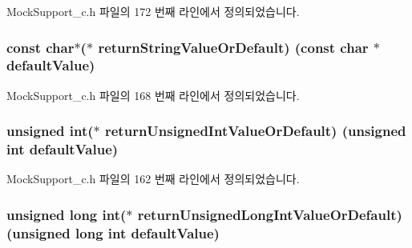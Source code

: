 Mock\+Support\+\_\+c.\+h 파일의 172 번째 라인에서 정의되었습니다.

\subsubsection[{\texorpdfstring{return\+String\+Value\+Or\+Default}{returnStringValueOrDefault}}]{\setlength{\rightskip}{0pt plus 5cm}const char$\ast$($\ast$ return\+String\+Value\+Or\+Default) (const char $\ast$default\+Value)}\hypertarget{struct_s_mock_support__c_a57df1d8b45c09709b1d15c3213ca86ba}{}\label{struct_s_mock_support__c_a57df1d8b45c09709b1d15c3213ca86ba}


Mock\+Support\+\_\+c.\+h 파일의 168 번째 라인에서 정의되었습니다.

\subsubsection[{\texorpdfstring{return\+Unsigned\+Int\+Value\+Or\+Default}{returnUnsignedIntValueOrDefault}}]{\setlength{\rightskip}{0pt plus 5cm}unsigned int($\ast$ return\+Unsigned\+Int\+Value\+Or\+Default) (unsigned int default\+Value)}\hypertarget{struct_s_mock_support__c_a5bcd1d17f1468d2d48778c42c05a222a}{}\label{struct_s_mock_support__c_a5bcd1d17f1468d2d48778c42c05a222a}


Mock\+Support\+\_\+c.\+h 파일의 162 번째 라인에서 정의되었습니다.

\subsubsection[{\texorpdfstring{return\+Unsigned\+Long\+Int\+Value\+Or\+Default}{returnUnsignedLongIntValueOrDefault}}]{\setlength{\rightskip}{0pt plus 5cm}unsigned long int($\ast$ return\+Unsigned\+Long\+Int\+Value\+Or\+Default) (unsigned long int default\+Value)}\hypertarget{struct_s_mock_support__c_aeb93f4fd4eedf7c83d4bdf04eab48e3c}{}\label{struct_s_mock_support__c_aeb93f4fd4eedf7c83d4bdf04eab48e3c}


